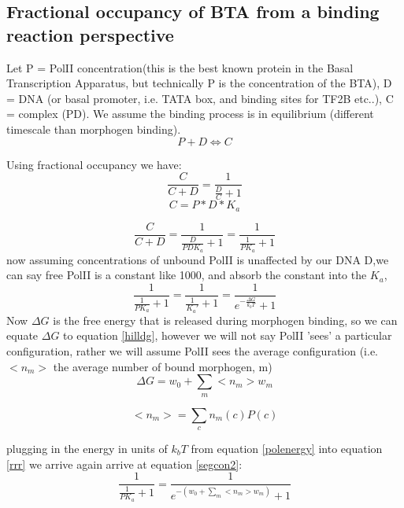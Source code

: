 \subsection{Fractional occupancy of BTA from a binding reaction perspective }
Let P = PolII concentration(this is the best known protein in the Basal Transcription Apparatus, but technically P is the concentration of the BTA), D = DNA (or basal promoter, i.e. TATA box, and binding sites for TF2B etc..), C = complex (PD).  We assume the binding process is in equilibrium (different timescale than morphogen binding).
\begin{equation}\label{}
    P + D \Leftrightarrow C
\end{equation}

Using fractional occupancy we have:
\begin{equation}\label{}
    \frac{C}{C + D} = \frac{1}{\frac{D}{C} + 1}
\end{equation}
\begin{equation}\label{}
    C = P*D*K_a
\end{equation}

\begin{equation}\label{}
   \frac{C}{C + D} = \frac{1}{\frac{D}{PDK_a} + 1} = \frac{1}{\frac{1}{PK_a} + 1}
\end{equation}
now assuming concentrations of unbound PolII is unaffected by our DNA D,we can say free PolII is a constant like 1000, and absorb the constant into the $K_a$,
\begin{equation}\label{rrr}
    \frac{1}{\frac{1}{PK_a} + 1} = \frac{1}{\frac{1}{K_a'} + 1} =\frac{1}{e^{-\frac{\Delta G}{k_bT} }+ 1}
\end{equation}
Now $\Delta G$ is the free energy that is released during morphogen binding, so  we can equate $ \Delta G $ to equation \eqref{hilldg}, however we will not say PolII 'sees' a particular configuration, rather we will assume PolII sees the average configuration (i.e. $<n_m>$ the average number of bound morphogen, m)
\begin{equation}\label{polenergy}
    \Delta G =  w_{0} + \sum_{m}  <n_m> w_{m}
\end{equation}

\begin{equation}\label{}
     <n_m> =\sum_c n_m(c) P(c)
     \end{equation}

plugging in the energy in units of $k_b T$  from equation \eqref{polenergy} into equation \eqref{rrr} we arrive again arrive at equation \eqref{segcon2}:
\begin{equation}\label{themodel}
      \frac{1}{\frac{1}{PK_a} + 1} = \frac{1}{e^{- (w_{0} + \sum_{m}  <n_m> w_{m} ) }+ 1}
\end{equation}

